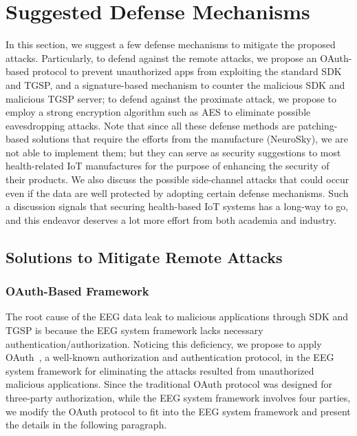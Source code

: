 \section{Suggested Defense Mechanisms}
\label{sec:defense}

In this section, we suggest a few defense mechanisms to mitigate the proposed attacks. Particularly, to defend against the remote attacks, we propose an OAuth-based protocol to prevent unauthorized apps from exploiting the standard SDK and TGSP, and a signature-based mechanism to counter the malicious SDK and malicious TGSP server; to defend against the proximate attack, we propose to employ a strong encryption algorithm such as AES to eliminate possible eavesdropping attacks. Note that since all these defense methods are patching-based solutions that require the efforts from the manufacture (NeuroSky), we are not able to implement them; but they can %
serve as security suggestions to most health-related IoT manufactures for the purpose of enhancing the security of their products. We also discuss the possible side-channel attacks that could occur even if the data are well protected by adopting certain defense mechanisms. Such a discussion signals that securing health-based IoT systems has a long-way to go, and this endeavor deserves a lot more effort from both academia and industry.

\subsection{Solutions to Mitigate Remote Attacks}

\subsubsection{OAuth-Based Framework}

The root cause of the EEG data leak to malicious applications through SDK and TGSP is because the EEG system framework lacks necessary authentication/authorization. Noticing this deficiency,  we propose to apply OAuth~\cite{hardt2012oauth}, a well-known authorization and authentication protocol, in the EEG system framework for eliminating the attacks resulted from unauthorized malicious applications. Since the traditional OAuth protocol was designed for three-party authorization, while the EEG system framework involves four parties, we modify the OAuth protocol to fit into the EEG system framework and present the details in the following paragraph.

